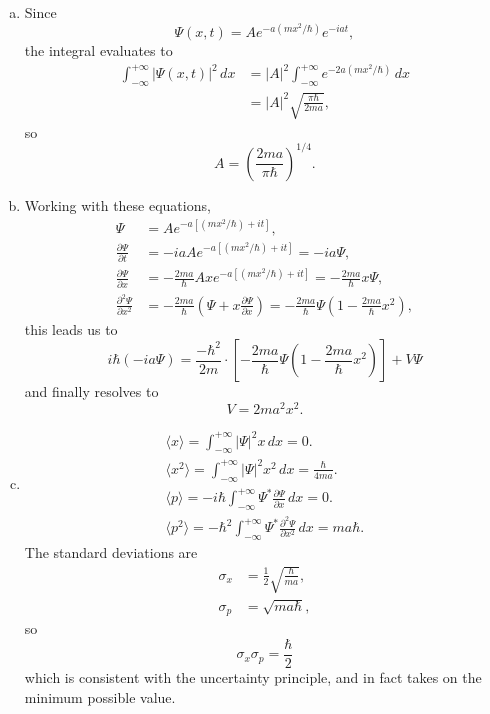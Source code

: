 \documentclass{article}
\begin{document}
\begin{enumerate}[(a)]
  \item Since \[
      \Psi(x, t) = A e^{-a(mx^2/\hbar)} e^{-iat},
    \] the integral evaluates to
    \begin{align*}
      \int_{-\infty}^{+\infty} |\Psi(x, t)|^2 \,dx
      &= |A|^2 \int_{-\infty}^{+\infty} e^{-2a(mx^2/\hbar)} \,dx \\
      &= |A|^2 \sqrt{\frac{\pi\hbar}{2ma}},
    \end{align*}
    so \[ A = \left( \frac{2ma}{\pi\hbar} \right)^{1/4}. \]
  \item Working with these equations,
    \begin{align*}
      \Psi &= Ae^{-a[(mx^2/\hbar) + it]}, \\
      \frac{\partial \Psi}{\partial t}
           &= -iaA e^{-a[(mx^2/\hbar) + it]} = -ia \Psi, \\
      \frac{\partial \Psi}{\partial x}
           &= -\frac{2ma}{\hbar} Ax e^{-a[(mx^2/\hbar) + it]}
           = -\frac{2ma}{\hbar} x \Psi, \\
      \frac{\partial^2 \Psi}{\partial x^2}
           &= -\frac{2ma}{\hbar} \left(
            \Psi + x \frac{\partial \Psi}{\partial x}
           \right)
           = -\frac{2ma}{\hbar} \Psi \left( 1 - \frac{2ma}{\hbar} x^2 \right),
    \end{align*}
    this leads us to \[
      i\hbar(-ia\Psi) = \frac{-\hbar^2}{2m} \cdot \left[
        -\frac{2ma}{\hbar} \Psi \left( 1 - \frac{2ma}{\hbar} x^2 \right)
      \right] + V\Psi
    \] and finally resolves to \[
      V = 2ma^2x^2.
    \]
  \item
    \begin{gather*}
      \langle x \rangle = \int_{-\infty}^{+\infty} |\Psi|^2x \,dx = 0. \\
      \langle x^2 \rangle = \int_{-\infty}^{+\infty} |\Psi|^2x^2 \,dx =
        \frac{\hbar}{4ma}. \\
      \langle p \rangle = -i\hbar \int_{-\infty}^{+\infty}
        \Psi^* \frac{\partial \Psi}{\partial x}
      \,dx = 0. \\
      \langle p^2 \rangle = -\hbar^2 \int_{-\infty}^{+\infty}
        \Psi^* \frac{\partial^2 \Psi}{\partial x^2}
      \,dx = ma\hbar.
    \end{gather*} The standard deviations are
    \begin{align*}
      \sigma_x &= \frac{1}{2}\sqrt{\frac{\hbar}{ma}}, \\
      \sigma_p &= \sqrt{ma\hbar},
    \end{align*}
    so \[
      \sigma_x \sigma_p = \frac{\hbar}{2}
    \] which is consistent with the uncertainty principle, and in fact takes on
    the minimum possible value.
\end{enumerate}
\end{document}
